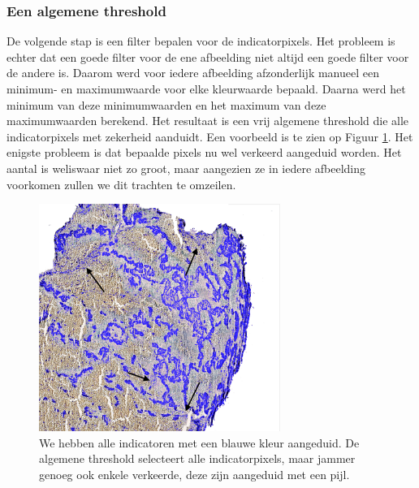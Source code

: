 \documentclass[a4paper,kulak]{kulakarticle}
\begin{document}
\subsubsection{Een algemene threshold}
De volgende stap is een filter bepalen voor de indicatorpixels. Het probleem is echter dat een goede filter voor de ene afbeelding niet altijd een goede filter voor de andere is. Daarom werd voor iedere afbeelding afzonderlijk manueel een minimum- en maximumwaarde voor elke kleurwaarde bepaald. Daarna werd het minimum van deze minimumwaarden en het maximum van deze maximumwaarden berekend. Het resultaat is een vrij algemene threshold die alle indicatorpixels met zekerheid aanduidt. Een voorbeeld is te zien op Figuur \ref{figuur alg_tresh}. Het enigste probleem is dat bepaalde pixels nu wel verkeerd aangeduid worden. Het aantal is weliswaar niet zo groot, maar aangezien ze in iedere afbeelding voorkomen zullen we dit trachten te omzeilen.
\begin{figure}[H]
	\centering
	\includegraphics[width = 0.7\textwidth]{algemene_threshold}
	
	\caption{We hebben alle indicatoren met een blauwe kleur aangeduid. De algemene threshold selecteert alle indicatorpixels, maar jammer genoeg ook enkele verkeerde, deze zijn aangeduid met een pijl.}
	\label{figuur alg_tresh}
\end{figure}
\end{document}
